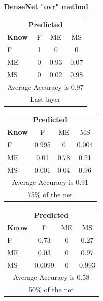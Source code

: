 \documentclass[12pt]{article} %
\begin{document}
\begin{center}
\textbf{ DenseNet "ovr" method}
\end{center}
\begin{minipage}{0.5\textwidth}
\begin{center}
\begin{tabular}{l|c|c|c|}
 \multicolumn{4}{c}{ \textbf{ Predicted}}\\
 \textbf{Know}&F&ME&MS\\ \hline\hline
F   &1&0&0\\
ME &0&0.93&0.07\\
MS &0&0.02&0.98\\
\multicolumn{4}{c}{Average Accuracy is 0.97}\\
\multicolumn{4}{c}{Last layer}\\
\end{tabular}
\end{center}
\end{minipage}
\begin{minipage}{0.5\textwidth}
\begin{center}
\begin{tabular}{l|c|c|c|}
 \multicolumn{4}{c}{ \textbf{ Predicted}}\\
 \textbf{Know}&F&ME&MS\\ \hline\hline
F    &0.995&0&0.004\\
ME &0.01&0.78&0.21\\
MS &0.001&0.04&0.96\\
\multicolumn{4}{c}{Average Accuracy is 0.91}\\
\multicolumn{4}{c}{75\%  of the net}\\
\end{tabular}
\end{center}
\end{minipage}
\begin{minipage}{0.5\textwidth}
\begin{center}
\begin{tabular}{l|c|c|c|}
 \multicolumn{4}{c}{ \textbf{ Predicted}}\\
 \textbf{Know}&F&ME&MS\\ \hline\hline
F   &0.73&0&0.27\\
ME &0.03&0&0.97\\
MS &0.0099&0&0.993\\
\multicolumn{4}{c}{Average Accuracy is 0.58}\\
\multicolumn{4}{c}{50\%  of the net}\\
\end{tabular}
\end{center}
\end{minipage}
\end{document}
